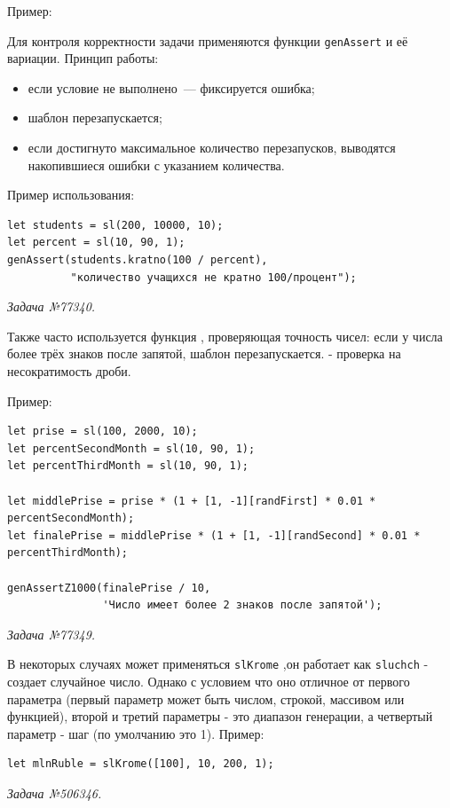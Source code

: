 Пример: 


Для контроля корректности задачи применяются функции \texttt{genAssert} и её вариации. Принцип работы:  
\begin{itemize}
    \item если условие не выполнено~— фиксируется ошибка;
    \item шаблон перезапускается;
    \item если достигнуто максимальное количество перезапусков, выводятся накопившиеся ошибки с указанием количества.
\end{itemize}

Пример использования:
\begin{lstlisting}
let students = sl(200, 10000, 10);
let percent = sl(10, 90, 1); 
genAssert(students.kratno(100 / percent),
          "количество учащихся не кратно 100/процент");
\end{lstlisting}
\textsl{Задача №77340.}

Также часто используется функция , проверяющая точность чисел: если у числа более трёх знаков после запятой, шаблон перезапускается.  
 - проверка на несократимость дроби.

Пример:
\begin{lstlisting}
let prise = sl(100, 2000, 10);
let percentSecondMonth = sl(10, 90, 1);
let percentThirdMonth = sl(10, 90, 1);

let middlePrise = prise * (1 + [1, -1][randFirst] * 0.01 * percentSecondMonth);
let finalePrise = middlePrise * (1 + [1, -1][randSecond] * 0.01 * percentThirdMonth);

genAssertZ1000(finalePrise / 10,
               'Число имеет более 2 знаков после запятой');
\end{lstlisting}
\textsl{Задача №77349.}



В некоторых случаях может применяться \texttt{slKrome} ,он работает как \texttt{sluchch} - создает случайное число. Однако с условием что оно  отличное от
		первого параметра (первый параметр может быть числом, строкой, массивом или функцией),
		второй и третий параметры - это диапазон генерации, а четвертый параметр - шаг (по умолчанию это 1).
Пример:
\begin{lstlisting}
let mlnRuble = slKrome([100], 10, 200, 1);
\end{lstlisting}
\textsl{Задача №506346.}

